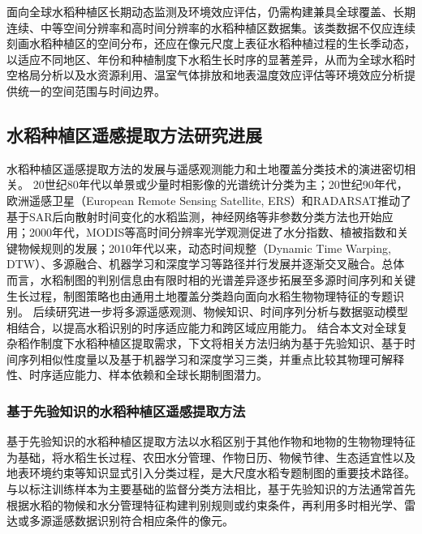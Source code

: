 面向全球水稻种植区长期动态监测及环境效应评估，仍需构建兼具全球覆盖、长期连续、中等空间分辨率和高时间分辨率的水稻种植区数据集。该类数据不仅应连续刻画水稻种植区的空间分布，还应在像元尺度上表征水稻种植过程的生长季动态，以适应不同地区、年份和种植制度下水稻生长时序的显著差异，从而为全球水稻时空格局分析以及水资源利用、温室气体排放和地表温度效应评估等环境效应分析提供统一的空间范围与时间边界。

\subsection{水稻种植区遥感提取方法研究进展}

水稻种植区遥感提取方法的发展与遥感观测能力和土地覆盖分类技术的演进密切相关。
20世纪80年代以单景或少量时相影像的光谱统计分类为主；20世纪90年代，欧洲遥感卫星（European Remote Sensing Satellite, ERS）和RADARSAT推动了基于SAR后向散射时间变化的水稻监测，神经网络等非参数分类方法也开始应用；2000年代，MODIS等高时间分辨率光学观测促进了水分指数、植被指数和关键物候规则的发展；2010年代以来，动态时间规整（Dynamic Time Warping, DTW）、多源融合、机器学习和深度学习等路径并行发展并逐渐交叉融合。总体而言，水稻制图的判别信息由有限时相的光谱差异逐步拓展至多源时间序列和关键生长过程，制图策略也由通用土地覆盖分类趋向面向水稻生物物理特征的专题识别\citep{Dong2016}。
后续研究进一步将多源遥感观测、物候知识、时间序列分析与数据驱动模型相结合，以提高水稻识别的时序适应能力和跨区域应用能力。
结合本文对全球复杂稻作制度下水稻种植区提取需求，下文将相关方法归纳为基于先验知识、基于时间序列相似性度量以及基于机器学习和深度学习三类，并重点比较其物理可解释性、时序适应能力、样本依赖和全球长期制图潜力。

\subsubsection{基于先验知识的水稻种植区遥感提取方法}
\label{sec:prior_knowledge_methods}

基于先验知识的水稻种植区提取方法以水稻区别于其他作物和地物的生物物理特征为基础，将水稻生长过程、农田水分管理、作物日历、物候节律、生态适宜性以及地表环境约束等知识显式引入分类过程，是大尺度水稻专题制图的重要技术路径\citep{Dong2016}。与以标注训练样本为主要基础的监督分类方法相比，基于先验知识的方法通常首先根据水稻的物候和水分管理特征构建判别规则或约束条件，再利用多时相光学、雷达或多源遥感数据识别符合相应条件的像元。

